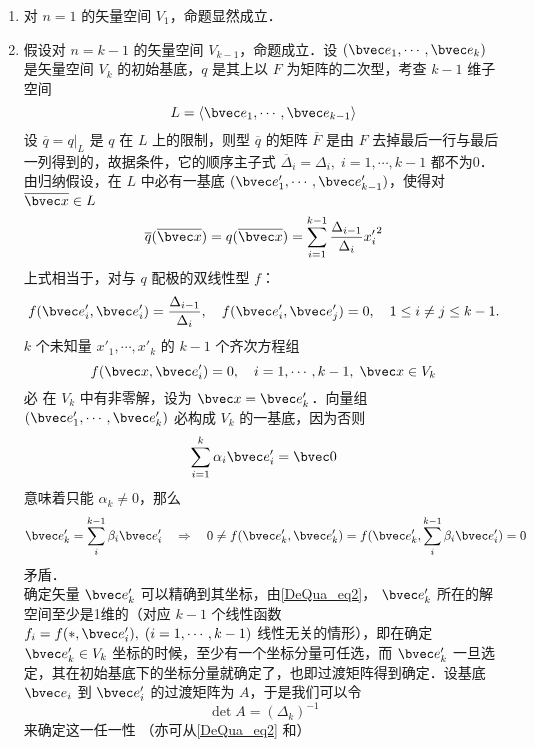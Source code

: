 \begin{enumerate}
\item 对 $n=1$ 的矢量空间 $V_1$，命题显然成立．
\item 假设对 $n=k-1$ 的矢量空间 $V_{k-1}$，命题成立．设 $(\bvec e_1,\cdots,\bvec e_k)$ 是矢量空间 $V_k$ 的初始基底，$q$ 是其上以 $F$ 为矩阵的二次型，考查 $k-1$ 维子空间
\begin{equation}
L=\langle\bvec e_1,\cdots,\bvec e_{k-1}\rangle
\end{equation}
设 $\overline q=q|_L$ 是 $q$ 在 $L$ 上的限制，则型 $\overline q$ 的矩阵 $\overline F$ 是由 $F$ 去掉最后一行与最后一列得到的，故据条件，它的顺序主子式 $\overline\Delta_i=\Delta_i,\;i=1,\cdots,k-1$ 都不为0．由归纳假设，在 $L$ 中必有一基底 $(\bvec e'_1,\cdots,\bvec e'_{k-1})$，使得对 $\overline{\bvec x}\in L$
\begin{equation}
\overline q(\overline{\bvec x})=q(\overline{\bvec x})=\sum_{i=1}^{k-1}\frac{\Delta_{i-1}}{\Delta_i}{x'_{i}}^2
\end{equation}
上式相当于，对与 $q$ 配极的双线性型 $f$：
\begin{equation}
f(\bvec e'_i,\bvec e'_i)=\frac{\Delta_{i-1}}{\Delta_{i}},\quad f(\bvec e'_i,\bvec e'_j)=0,\quad 1\leq i\neq j\leq k-1.
\end{equation}
 $k$ 个未知量 $x'_1,\cdots,x'_k$ 的 $k-1$ 个齐次方程组
 \begin{equation}\label{DeQua_eq2}
 f(\bvec x,\bvec e'_i)=0,\quad i=1,\cdots,k-1,\;\bvec x\in V_k
 \end{equation}
 必 在 $V_k$ 中有非零解，设为 $\bvec x=\bvec e'_k$．向量组 $(\bvec e'_1,\cdots,\bvec e'_k)$ 必构成 $V_k$ 的一基底，因为否则
 \begin{equation}
 \sum_{i=1}^k\alpha_i\bvec e'_i=\bvec 0
 \end{equation}
 意味着只能 $\alpha_k\neq0$，那么 
 \begin{equation}
 \bvec e'_k=\sum_i^{k-1}\beta_i\bvec e'_i\quad
 \Rightarrow\quad 0\neq f(\bvec e'_k,\bvec e'_k)=f(\bvec e'_k,\sum_i^{k-1}\beta_i\bvec e'_i)=0
 \end{equation}
 矛盾．\\

 确定矢量 $\bvec e'_k$ 可以精确到其坐标，由\autoref{DeQua_eq2}， $\bvec e'_k$ 所在的解空间至少是1维的（对应 $k-1$ 个线性函数 $f_i=f(*,\bvec e'_i),\;(i=1,\cdots,k-1)$ 线性无关的情形），即在确定 $\bvec e'_k\in V_k$ 坐标的时候，至少有一个坐标分量可任选，而 $\bvec e'_k$ 一旦选定，其在初始基底下的坐标分量就确定了，也即过渡矩阵得到确定．设基底 $\bvec e_i$ 到 $\bvec e'_i$ 的过渡矩阵为 $A$，于是我们可以令
 \begin{equation}\label{DeQua_eq3}
 \det A=(\Delta_k)^{-1}
 \end{equation}
 来确定这一任一性 （亦可从\autoref{DeQua_eq2} 和）

\end{enumerate}
